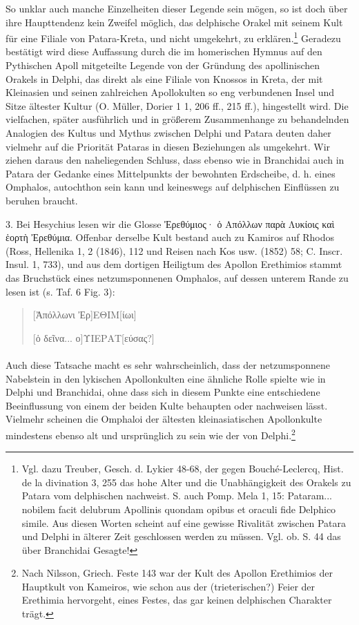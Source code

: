 \documentclass[a4paper, 11pt, oneside]{article}
\begin{document}
So unklar auch manche Einzelheiten dieser Legende sein mögen, so ist doch über ihre Haupttendenz kein Zweifel möglich, das delphische Orakel mit seinem Kult für eine Filiale von Patara-Kreta, und nicht umgekehrt, zu erklären.\footnote{Vgl. dazu Treuber, Gesch. d. Lykier 48-68, der gegen Bouché-Leclercq, Hist. de la divination 3, 255 das hohe Alter und die Unabhängigkeit des Orakels zu Patara vom delphischen nachweist. S. auch Pomp. Mela 1, 15: Pataram... nobilem facit delubrum Apollinis quondam opibus et oraculi fide Delphico simile. Aus diesen Worten scheint auf eine gewisse Rivalität zwischen Patara und Delphi in älterer Zeit geschlossen werden zu müssen. Vgl. ob. S. 44 das über Branchidai Gesagte!} Geradezu bestätigt wird diese Auffassung durch die im homerischen Hymnus auf den Pythischen Apoll mitgeteilte Legende von der Gründung des apollinischen Orakels in Delphi, das direkt als eine Filiale von Knossos in Kreta, der mit Kleinasien und seinen zahlreichen Apollokulten so eng verbundenen Insel und Sitze ältester Kultur (O. Müller, Dorier 1 1, 206 ff., 215 ff.), hingestellt wird. Die vielfachen, später ausführlich und in größerem Zusammenhange zu behandelnden Analogien des Kultus und Mythus zwischen Delphi und Patara deuten daher vielmehr auf die Priorität Pataras in diesen Beziehungen als umgekehrt. Wir ziehen daraus den naheliegenden Schluss, dass ebenso wie in Branchidai auch in Patara der Gedanke eines Mittelpunkts der bewohnten Erdscheibe, d. h. eines Omphalos, autochthon sein kann und keineswegs auf delphischen Einflüssen zu beruhen braucht.

3. Bei Hesychius lesen wir die Glosse Ἐρεθύμιος· ὁ Απόλλων παρὰ Λυκίοις καὶ ἑορτὴ Ἐρεθύμια. Offenbar derselbe Kult bestand auch zu Kamiros auf Rhodos (Ross, Hellenika 1, 2 (1846), 112 und Reisen nach Kos usw. (1852) 58; C. Inscr. Insul. 1, 733), und aus dem dortigen Heiligtum des Apollon Erethimios stammt das Bruchstück eines netzumsponnenen Omphalos, auf dessen unterem Rande zu lesen ist (s. Taf. 6 Fig. 3):
\begin{quotation}
[Ἀπόλλωνι Ἐρ]ΕΘΙΜ[ίωι]

[ὁ δεῖνα... ο]ΥΙΕΡΑΤ[εύσας?]
\end{quotation}
\paragraph{}
Auch diese Tatsache macht es sehr wahrscheinlich, dass der netzumsponnene Nabelstein in den lykischen Apollonkulten eine ähnliche Rolle spielte wie in Delphi und Branchidai, ohne dass sich in diesem Punkte eine entschiedene Beeinflussung von einem der beiden Kulte behaupten oder nachweisen lässt. Vielmehr scheinen die Omphaloi der ältesten kleinasiatischen Apollonkulte mindestens ebenso alt und ursprünglich zu sein wie der von Delphi.\footnote{Nach Nilsson, Griech. Feste 143 war der Kult des Apollon Erethimios der Hauptkult von Kameiros, wie schon aus der (trieterischen?) Feier der Erethimia hervorgeht, eines Festes, das gar keinen delphischen Charakter trägt.}
\end{document}
